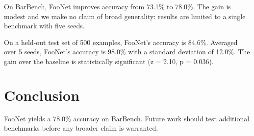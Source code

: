 \documentclass{article}
\begin{document}
On BarBench, FooNet improves accuracy from 73.1\% to 78.0\%. The gain is
modest and we make no claim of broad generality: results are limited to a
single benchmark with five seeds.

On a held-out test set of 500 examples, FooNet's accuracy is 84.6\%.
Averaged over 5 seeds, FooNet's accuracy is 98.0\% with a standard
deviation of 12.0\%. The gain over the baseline is statistically
significant (z = 2.10, p = 0.036).

\section{Conclusion}
FooNet yields a 78.0\% accuracy on BarBench. Future work should test
additional benchmarks before any broader claim is warranted.
\end{document}
